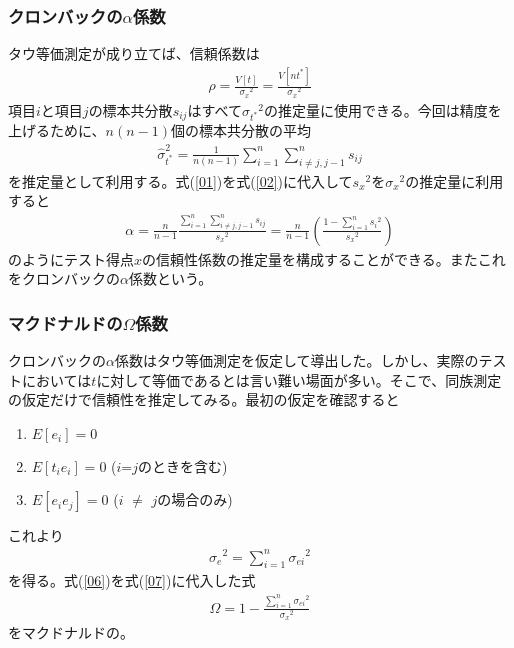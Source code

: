 \documentclass{jarticle}
\begin{document}
\subsubsection{クロンバックの$\displaystyle \alpha$係数}
タウ等価測定が成り立てば、信頼係数は
\begin{eqnarray}
  \label{02}
  \displaystyle \rho=\frac{V[t]}{{\sigma_{x}}^2}=\frac{V[nt^{\ast}]}{{\sigma_{x}}^2}
\end{eqnarray}
項目$i$と項目$j$の標本共分散$s_{ij}$はすべて$\displaystyle  {\sigma_{t^\ast}}^2$の推定量に使用できる。今回は精度を上げるために、$n(n-1)$個の標本共分散の平均
\begin{eqnarray}
  \label{01}
  \displaystyle \hat{\sigma}_{t^\ast}^2=\frac{1}{n(n-1)}\sum_{i=1}^{n} \sum_{i\neq j,j-1}^{n} s_{ij}
\end{eqnarray}
を推定量として利用する。式(\ref{01})を式(\ref{02})に代入して${s_{x}}^2$を${\sigma_{x}}^2$の推定量に利用すると
\begin{eqnarray}
  \displaystyle \alpha=\frac{n}{n-1} \frac{\sum_{i=1}^{n} \sum_{i\neq j,j-1}^{n} s_{ij}}{{s_{x}}^2}=\frac{n}{n-1} \left(\frac{1-\sum_{i=1}^{n} {s_{i}}^2} {{s_{x}}^2}\right)
\end{eqnarray}
のようにテスト得点$x$の信頼性係数の推定量を構成することができる。またこれをクロンバックの$\alpha$係数という。
\subsubsection{マクドナルドの$\displaystyle \Omega$係数}
クロンバックの$\alpha$係数はタウ等価測定を仮定して導出した。しかし、実際のテストにおいては$t$に対して等価であるとは言い難い場面が多い。そこで、同族測定の仮定だけで信頼性を推定してみる。最初の仮定を確認すると
\begin{screen}
  \begin{enumerate}
    \item  $E[e_{i}] = 0$
    \item  $E[t_{i}e_{i}] = 0$ ($i$=$j$のときを含む)
    \item  $E[e_{i}e_{j}] = 0$ ($i$ $\neq$ $j$の場合のみ)
  \end{enumerate}
\end{screen}
これより
\begin{eqnarray}
  \label{06}
  \displaystyle {\sigma_{e}}^2=\sum_{i=1}^{n} {\sigma_{ei}}^2
\end{eqnarray}
を得る。式(\ref{06})を式(\ref{07})に代入した式
\begin{eqnarray}
  \label{08}
\displaystyle \Omega=1-\frac{\sum_{i=1}^{n} {\sigma_{ei}}^2}{{\sigma_{x}}^2}
\end{eqnarray}
をマクドナルドの。
\end{document}
